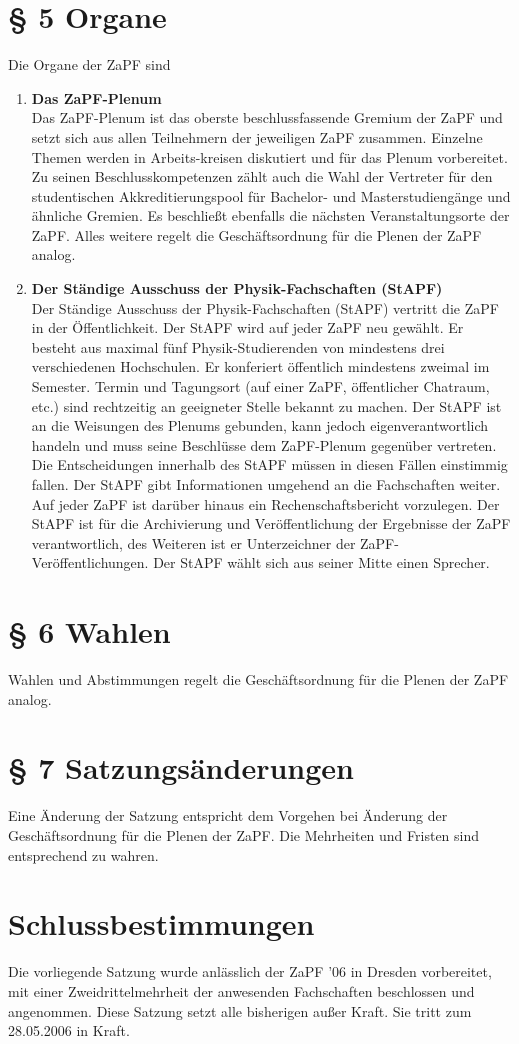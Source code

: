 \section*{§ 5 Organe}
Die Organe der ZaPF sind
\begin{enumerate}
\item{\textbf{Das ZaPF-Plenum}\\
Das ZaPF-Plenum ist das oberste beschlussfassende Gremium der ZaPF und setzt sich aus allen Teilnehmern der jeweiligen ZaPF
zusammen. Einzelne Themen werden in Arbeits-kreisen diskutiert und für das Plenum vorbereitet. Zu seinen Beschlusskompetenzen
zählt auch die Wahl der Vertreter für den studentischen Akkreditierungspool für Bachelor- und Masterstudiengänge und ähnliche
Gremien. Es beschließt ebenfalls die nächsten Veranstaltungsorte der ZaPF. Alles weitere regelt die Geschäftsordnung für die Plenen der
ZaPF analog.}
\item{\textbf{Der Ständige Ausschuss der Physik-Fachschaften (StAPF)}\\
Der Ständige Ausschuss der Physik-Fachschaften (StAPF) vertritt die
ZaPF in der Öffentlichkeit. Der StAPF wird auf jeder ZaPF neu
gewählt. Er besteht aus maximal fünf Physik-Studierenden von
mindestens drei verschiedenen Hochschulen. Er konferiert öffentlich
mindestens zweimal im Semester. Termin und Tagungsort (auf
einer ZaPF, öffentlicher Chatraum, etc.) sind rechtzeitig an
geeigneter Stelle bekannt zu machen. Der StAPF ist an die Weisungen
des Plenums gebunden, kann jedoch eigenverantwortlich handeln und
muss seine Beschlüsse dem ZaPF-Plenum gegenüber vertreten. Die
Entscheidungen innerhalb des StAPF müssen in diesen Fällen
einstimmig fallen. Der StAPF gibt Informationen umgehend an die
Fachschaften weiter. Auf jeder ZaPF ist darüber hinaus ein
Rechenschaftsbericht vorzulegen. Der StAPF ist für die Archivierung
und Veröffentlichung der Ergebnisse der ZaPF verantwortlich, des
Weiteren ist er Unterzeichner der ZaPF-Veröffentlichungen. Der StAPF
wählt sich aus seiner Mitte einen Sprecher.}
\end{enumerate}
\section*{§ 6 Wahlen}
Wahlen und Abstimmungen regelt die Geschäftsordnung für die Plenen der ZaPF analog.

\section*{§ 7 Satzungsänderungen}
Eine Änderung der Satzung entspricht dem Vorgehen bei Änderung der Geschäftsordnung für die Plenen der ZaPF.
Die Mehrheiten und Fristen sind entsprechend zu wahren.

\section*{Schlussbestimmungen}
Die vorliegende Satzung wurde anlässlich der ZaPF '06 in Dresden
vorbereitet, mit einer Zweidrittelmehrheit der anwesenden
Fachschaften beschlossen und angenommen. Diese Satzung setzt alle
bisherigen außer Kraft. Sie tritt zum 28.05.2006 in Kraft.


